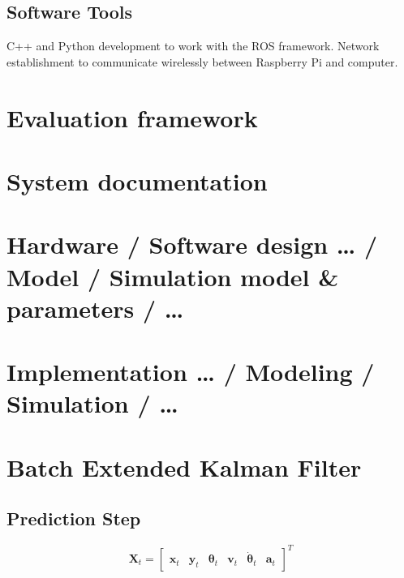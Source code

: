 \subsection{Software Tools}
C++ and Python development to work with the ROS framework.
Network establishment to communicate wirelessly between Raspberry Pi and computer.


\section{Evaluation framework}
\label{sec:evaluationFramework}

\section{System documentation}




\section{Hardware / Software design … / Model / Simulation model \& parameters / …}

 


\section{Implementation … / Modeling / Simulation / …}
\label{sec:implementationDetails}

\section{Batch Extended Kalman Filter}

\subsection{Prediction Step}

$$
  \label{eq:state-transf}
\mathbf{X}_t=
\begin{bmatrix} 
\mathbf{x}_t & \mathbf{y}_t & \boldsymbol \theta_t & \mathbf{v}_t & \dot{\boldsymbol \theta}_t & \mathbf{a}_t 
\end{bmatrix} ^T
$$

